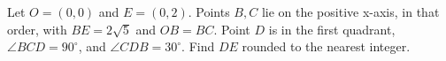 Let $O=(0,0)$ and $E=(0,2)$. Points $B,C$ lie on the positive x-axis, in that order, with $BE=2\sqrt5$ and $OB=BC$. Point $D$ is in the first quadrant, $\angle BCD=90^\circ$, and $\angle CDB=30^\circ$. Find $DE$ rounded to the nearest integer.
